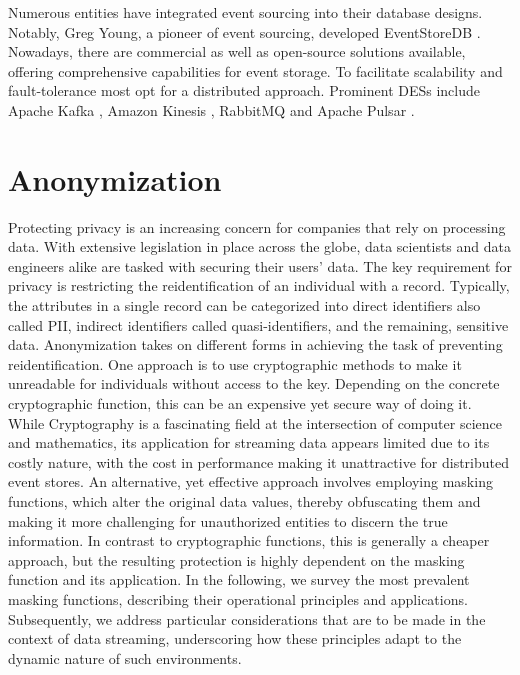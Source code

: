 Numerous entities have integrated event sourcing into their database designs. Notably, Greg Young, a pioneer of event sourcing, developed EventStoreDB \cite{eventstore_db}. Nowadays, there are commercial as well as open-source solutions available, offering comprehensive capabilities for event storage. To facilitate scalability and fault-tolerance most opt for a distributed approach. Prominent \acp{DES} include Apache Kafka \cite{kafka}, Amazon Kinesis \cite{amazon_kinesis}, RabbitMQ \cite{rabbit_mq} and Apache Pulsar \cite{pulsar}.

\section{Anonymization\label{sec:anon}}
Protecting privacy is an increasing concern for companies that rely on processing data. With extensive legislation in place across the globe, data scientists and data engineers alike are tasked with securing their users' data. The key requirement for privacy is restricting the reidentification of an individual with a record. Typically, the attributes in a single record can be categorized into direct identifiers also called \ac{PII}, indirect identifiers called quasi-identifiers, and the remaining, sensitive data. Anonymization takes on different forms in achieving the task of preventing reidentification. One approach is to use cryptographic methods to make it unreadable for individuals without access to the key. Depending on the concrete cryptographic function, this can be an expensive yet secure way of doing it. While Cryptography is a fascinating field at the intersection of computer science and mathematics, its application for streaming data appears limited due to its costly nature, with the cost in performance making it unattractive for distributed event stores. An alternative, yet effective approach involves employing masking functions, which alter the original data values, thereby obfuscating them and making it more challenging for unauthorized entities to discern the true information. In contrast to cryptographic functions, this is generally a cheaper approach, but the resulting protection is highly dependent on the masking function and its application. In the following, we survey the most prevalent masking functions, describing their operational principles and applications. Subsequently, we address particular considerations that are to be made in the context of data streaming, underscoring how these principles adapt to the dynamic nature of such environments.

